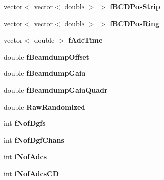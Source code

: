 \begin{DoxyCompactItemize}
\item 
\mbox{\label{class_calibration_a3a011b25d22e065da7cc0e758dc73d63}} 
vector$<$ vector$<$ double $>$ $>$ {\bfseries f\+B\+C\+D\+Pos\+Strip}
\item 
\mbox{\label{class_calibration_a76aaf9355d2e29501ddc97028d9cb02a}} 
vector$<$ vector$<$ double $>$ $>$ {\bfseries f\+B\+C\+D\+Pos\+Ring}
\item 
\mbox{\label{class_calibration_ad17489696497c9913e8fed070988fa28}} 
vector$<$ double $>$ {\bfseries f\+Adc\+Time}
\item 
\mbox{\label{class_calibration_abecda979659e8f0a7768f9969fb143fe}} 
double {\bfseries f\+Beamdump\+Offset}
\item 
\mbox{\label{class_calibration_ad9811871b4b5c8b602cf927420a73f67}} 
double {\bfseries f\+Beamdump\+Gain}
\item 
\mbox{\label{class_calibration_ad3621735f248e801440ee267478ac300}} 
double {\bfseries f\+Beamdump\+Gain\+Quadr}
\item 
\mbox{\label{class_calibration_aefdfefa1d8aaf1dd0dc4119566f44b79}} 
double {\bfseries Raw\+Randomized}
\item 
\mbox{\label{class_calibration_a19434507a5b8bbc2cdde3f0b6b4889c7}} 
int {\bfseries f\+Nof\+Dgfs}
\item 
\mbox{\label{class_calibration_af9fcd69a29bc601ccc864105ed805c2e}} 
int {\bfseries f\+Nof\+Dgf\+Chans}
\item 
\mbox{\label{class_calibration_a492ca80c45be9ce1d85dfbf9f5852030}} 
int {\bfseries f\+Nof\+Adcs}
\item 
\mbox{\label{class_calibration_af87f261e5f5b78583250d67e8e08419a}} 
int {\bfseries f\+Nof\+Adcs\+CD}
\item 
\mbox{\label{class_calibration_abfda2f79950ce5ca7bf1aca363519fc5}} 

\end{DoxyCompactItemize}
